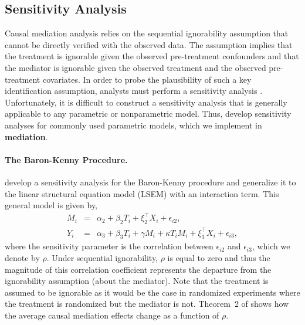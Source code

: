 \documentclass[11pt,letterpaper]{article}
\theoremstyle{plain}
\newcommand\bmediation{{\bf mediation}}
\begin{document}
\subsection{Sensitivity Analysis}

Causal mediation analysis relies on the sequential ignorability
assumption that cannot be directly verified with the observed data.
The assumption implies that the treatment is ignorable given the
observed pre-treatment confounders and that the mediator is ignorable
given the observed treatment and the observed pre-treatment
covariates.  In order to probe the plausibility of such a key
identification assumption, analysts must perform a sensitivity
analysis \citep{rose:02c}.  Unfortunately, it is difficult to
construct a sensitivity analysis that is generally applicable to any
parametric or nonparametric model.  Thus,
\citet{imai:keel:yama:10,imai:keel:ting:10} develop sensitivity
analyses for commonly used parametric models, which we implement in
\bmediation.

\paragraph{The Baron-Kenny Procedure.}

\citet{imai:keel:yama:10} develop a sensitivity analysis for the
Baron-Kenny procedure and \citet{imai:keel:ting:10} generalize it to
the linear structural equation model (LSEM) with an interaction term.
This general model is given by,
\begin{eqnarray}
  M_i & = & \alpha_2 + \beta_2 T_i + \xi_2^\top X_i + \epsilon_{i2}, \label{eq:MgivenTX} \\
  Y_i & = & \alpha_3 + \beta_3 T_i + \gamma M_i + \kappa T_i M_i + \xi_3^\top X_i + \epsilon_{i3}, \label{eq:YgivenTMX}
\end{eqnarray}
where the sensitivity parameter is the correlation between
$\epsilon_{i2}$ and $\epsilon_{i3}$, which we denote by $\rho$.  Under
sequential ignorability, $\rho$ is equal to zero and thus the
magnitude of this correlation coefficient represents the departure
from the ignorability assumption (about the mediator).  Note that the
treatment is assumed to be ignorable as it would be the case in
randomized experiments where the treatment is randomized but the
mediator is not.  Theorem~2 of \citet{imai:keel:ting:10} shows how the
average causal mediation effects change as a function of $\rho$.
\end{document}
